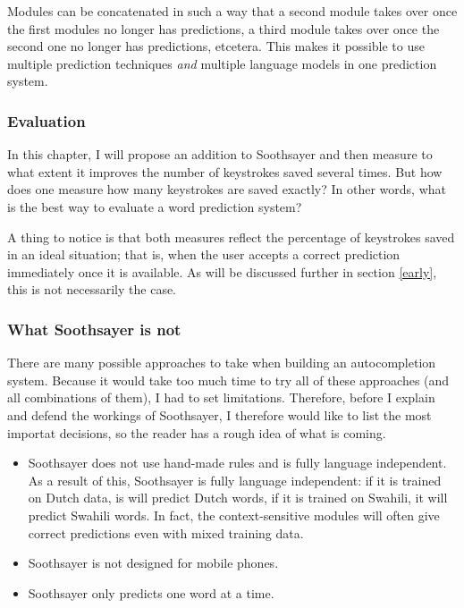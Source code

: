 \documentclass[12pt]{article}
\begin{document}
Modules can be concatenated in such a way that a second module takes over once the first modules no longer has predictions, a third module takes over once the second one no longer has predictions, etcetera. This makes it possible to use multiple prediction techniques \emph{and} multiple language models in one prediction system.

\subsubsection{Evaluation}
In this chapter, I will propose an addition to Soothsayer and then measure to what extent it improves the number of keystrokes saved several times. But how does one measure how many keystrokes are saved exactly? In other words, what is the best way to evaluate a word prediction system?



A thing to notice is that both measures reflect the percentage of keystrokes saved in an ideal situation; that is, when the user accepts a correct prediction immediately once it is available. As will be discussed further in section \ref{early}, this is not necessarily the case. 


\subsubsection{What Soothsayer is not}
There are many possible approaches to take when building an autocompletion system. Because it would take too much time to try all of these approaches (and all combinations of them), I had to set limitations. Therefore, before I explain and defend the workings of Soothsayer, I therefore would like to list the most importat decisions, so the reader has a rough idea of what is coming. 

\begin{itemize}
\item Soothsayer does not use hand-made rules and is fully language independent.
As a result of this, Soothsayer is fully language independent: if it is trained on Dutch data, is will predict Dutch words, if it is trained on Swahili, it will predict Swahili words. In fact, the context-sensitive modules will often give correct predictions even with mixed training data.
\item Soothsayer is not designed for mobile phones.

\item Soothsayer only predicts one word at a time.
\end{itemize}
\end{document}
